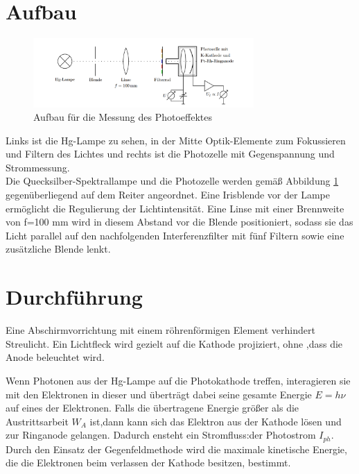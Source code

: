 \section{Aufbau}
\begin{figure}[htbp]
    \centering
    \includegraphics[width=0.75\textwidth]{figs/Aufbau_plank_wirkungsquantum.png}
    \caption{Aufbau für die Messung des Photoeffektes  \cite{praktikum}}
    \label{fig:aufbau teil 1}
\end{figure}
\FloatBarrier
Links ist die Hg-Lampe zu sehen, in der
Mitte Optik-Elemente zum Fokussieren und Filtern des Lichtes und rechts ist die Photozelle
mit Gegenspannung und Strommessung.\\
Die Quecksilber-Spektrallampe und die Photozelle 
werden gemäß Abbildung \ref{fig:aufbau teil 1} 
gegenüberliegend auf dem Reiter angeordnet. 
Eine Irisblende vor der Lampe ermöglicht die 
Regulierung der Lichtintensität. Eine Linse 
mit einer Brennweite von f=100 mm wird in 
diesem Abstand vor die Blende positioniert,
 sodass sie das Licht parallel auf den 
 nachfolgenden Interferenzfilter mit fünf 
 Filtern sowie eine zusätzliche Blende lenkt.

\section{Durchführung}

Eine Abschirmvorrichtung mit einem 
röhrenförmigen Element verhindert Streulicht. 
Ein Lichtfleck wird gezielt auf die Kathode 
projiziert, ohne ,dass die Anode beleuchtet wird.

Wenn Photonen aus der Hg-Lampe auf die Photokathode treffen, interagieren sie mit den Elektronen in dieser und überträgt dabei seine gesamte Energie $E = h\nu$
auf eines der Elektronen. Falls die übertragene Energie größer als die Austrittsarbeit $W_A$ ist,dann kann sich das Elektron aus der Kathode lösen und zur Ringanode gelangen. Dadurch ensteht ein Stromfluss:der Photostrom $I_{ph}$.
Durch den Einsatz der Gegenfeldmethode wird die maximale kinetische Energie, die die Elektronen beim verlassen der Kathode besitzen, bestimmt.

